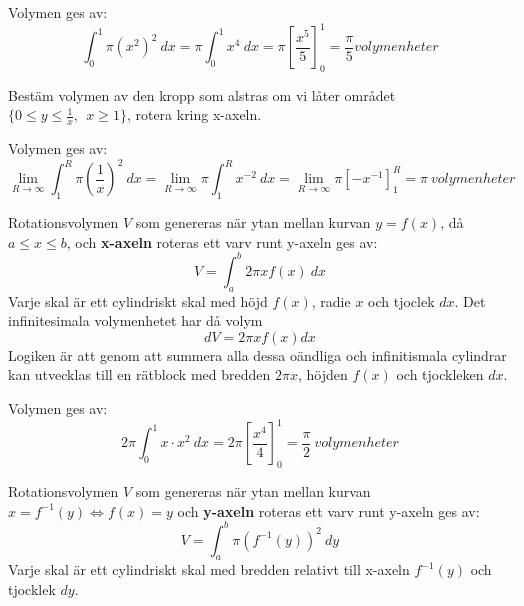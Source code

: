 \documentclass{report}
\begin{document}
{
Volymen ges av:
\begin{equation*}
	\int_{0}^{1} \pi (x^2)^2 \: dx = \pi \int_{0}^{1} x^4 \: dx = \pi [ \frac{x^5}{5} ]_{0}^{1} = \frac{\pi}{5} volymenheter
\end{equation*}
}

\qs{}
{
	Bestäm volymen av den kropp som alstras om vi låter området $ \{ 0 \le y \le \frac{1}{x},\:\: x \ge 1\} $, rotera kring x-axeln. 
}

\sol Volymen ges av:
\begin{equation*}
	\lim_{R \to \infty} \int_{1}^{R} \pi ( \frac{1}{x} )^2 \: dx = \lim_{R \to \infty} \pi \int_{1}^{R} x^{-2} \: dx = \lim_{R \to \infty} \pi [-x^{-1}]_{1}^{R} = \pi \: volymenheter 
\end{equation*}

{
Rotationsvolymen $ V $ som genereras när ytan mellan kurvan $ y = f(x) $, då $ a \le x \le b $, och \textbf{x-axeln}  roteras ett varv runt y-axeln ges av:
\begin{equation*}
V = \int_{a}^{b} 2\pi xf(x) \: dx 
\end{equation*}
Varje skal är ett cylindriskt skal med höjd $ f(x) $, radie $ x $ och tjoclek $ dx $. Det infinitesimala volymenhetet har då volym
\begin{equation*}
dV = 2\pi x f(x) dx
\end{equation*}
Logiken är att genom att summera alla dessa oändliga och infinitismala cylindrar kan utvecklas till en rätblock med bredden $ 2\pi x $, höjden $ f(x) $ och tjockleken $ dx $.
}

{
Volymen ges av:
\begin{equation*}
	2 \pi \int_{0}^{1} x \cdot x^2 \: dx = 2\pi[ \frac{x^4}{4} ]_{0}^{1} = \frac{\pi}{2} \: volymenheter 
\end{equation*}
}

{
	Rotationsvolymen $ V $ som genereras när ytan mellan kurvan $ x = f^{-1}(y) \iff f(x) = y $ och \textbf{y-axeln} roteras ett varv runt y-axeln ges av:
\begin{equation*}
	V = \int_{a}^{b} \pi (f^{-1}(y))^2 \: dy 
\end{equation*}
Varje skal är ett cylindriskt skal med bredden relativt till x-axeln $ f^{-1}(y) $ och tjocklek $ dy $.
}
\end{document}
